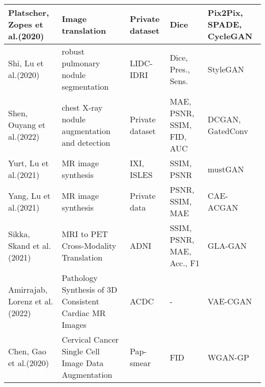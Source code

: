 \documentclass[preprint,12pt,authoryear]{elsarticle}
\begin{document}
{\begin{longtable}{|p{2cm}|p{3cm}|p{2cm}|p{2cm}|p{2cm}|}
Platscher, Zopes et al.(2020)\cite{apl16}     & Image translation                                         & Private dataset                                                   & Dice                                                     & Pix2Pix, SPADE, CycleGAN                  \\ \hline
Shi, Lu et al.(2020)\cite{apl17}              & robust pulmonary nodule segmentation                      & LIDC-IDRI                                                         & Dice, Pres., Sens.                                       & StyleGAN                                  \\ \hline
Shen, Ouyang et al.(2022)\cite{apl18}         & chest X-ray nodule augmentation and detection             & Private dataset                                                   & MAE, PSNR, SSIM, FID, AUC                                & DCGAN, GatedConv                          \\ \hline
Yurt, Lu et al.(2021)\cite{apl19}             & MR image synthesis                                        & IXI, ISLES                                                        & SSIM, PSNR                                               & mustGAN                                   \\ \hline
Yang, Lu et al.(2021)\cite{apl20}             & MR image synthesis                                        & Private data                                                      & PSNR, SSIM, MAE                                          & CAE-ACGAN                                 \\ \hline
Sikka, Skand et al.(2021)\cite{apl21}         & MRI to PET Cross-Modality Translation                     & ADNI                                                              & SSIM, PSNR, MAE, Acc., F1                                & GLA-GAN                                   \\ \hline
Amirrajab, Lorenz et al.(2022)\cite{apl22}    & Pathology Synthesis of 3D Consistent Cardiac MR Images    & ACDC                                                              & -                                                        & VAE-CGAN                                  \\ \hline
Chen, Gao et al.(2020)\cite{apl23}            & Cervical Cancer Single Cell Image Data Augmentation       & Pap-smear                                                         & FID                                                      & WGAN-GP                                   \\ \hline

\end{longtable}}
\end{document}
